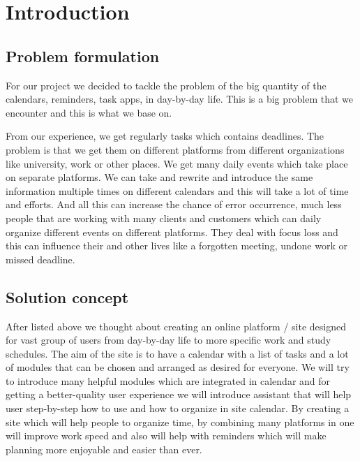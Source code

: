 \section{Introduction}

\subsection{Problem formulation}
\par For our project we decided to tackle the problem of the big quantity of the calendars, reminders, task apps, in day-by-day life. This is a big problem that we encounter and this is what we base on. 

From our experience, we get regularly tasks which contains deadlines. The problem is that we get them on different platforms from different organizations like university, work or other places. We get many daily events which take place on separate platforms. We can take and rewrite and introduce the same information multiple times on different calendars and this will take a lot of time and efforts. And all this can increase the chance of error occurrence, much less people that are working with many clients and customers which can daily organize different events on different platforms. They deal with focus loss and this can influence their and other lives like a forgotten meeting, undone work or missed deadline. 

\subsection{Solution concept}
\par After listed above we thought about creating an online platform / site designed for vast group of users from day-by-day life to more specific work and study schedules. The aim of the site is to have a calendar with a list of tasks and a lot of modules that can be chosen and arranged as desired for everyone. We will try to introduce many helpful modules which are integrated in calendar and for getting a better-quality user experience we will introduce assistant that will help user step-by-step how to use and how to organize in site calendar. By creating a site which will help people to organize time, by combining many platforms in one will improve work speed and also will help with reminders which will make planning more enjoyable and easier than ever.  

